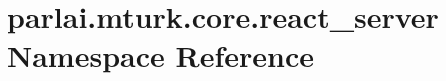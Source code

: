 \hypertarget{namespaceparlai_1_1mturk_1_1core_1_1react__server}{}\section{parlai.\+mturk.\+core.\+react\+\_\+server Namespace Reference}
\label{namespaceparlai_1_1mturk_1_1core_1_1react__server}
